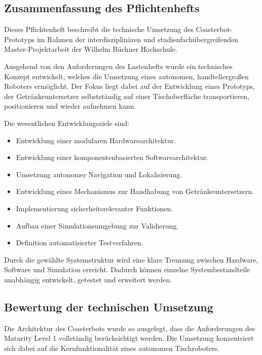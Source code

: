 \subsection{Zusammenfassung des
Pflichtenhefts}\label{zusammenfassung-des-pflichtenhefts}

Dieses Pflichtenheft beschreibt die technische Umsetzung des
Coasterbot-Prototyps im Rahmen der interdisziplinären und
studienfachübergreifenden Master-Projektarbeit der Wilhelm Büchner
Hochschule.

Ausgehend von den Anforderungen des Lastenhefts wurde ein technisches
Konzept entwickelt, welches die Umsetzung eines autonomen,
handtellergroßen Roboters ermöglicht. Der Fokus liegt dabei auf der
Entwicklung eines Prototyps, der Getränkeuntersetzer selbstständig auf
einer Tischoberfläche transportieren, positionieren und wieder aufnehmen
kann.

Die wesentlichen Entwicklungsziele sind:

\begin{itemize}
\tightlist
\item
  Entwicklung einer modularen Hardwarearchitektur.
\item
  Entwicklung einer komponentenbasierten Softwarearchitektur.
\item
  Umsetzung autonomer Navigation und Lokalisierung.
\item
  Entwicklung eines Mechanismus zur Handhabung von Getränkeuntersetzern.
\item
  Implementierung sicherheitsrelevanter Funktionen.
\item
  Aufbau einer Simulationsumgebung zur Validierung.
\item
  Definition automatisierter Testverfahren.
\end{itemize}

Durch die gewählte Systemstruktur wird eine klare Trennung zwischen
Hardware, Software und Simulation erreicht. Dadurch können einzelne
Systembestandteile unabhängig entwickelt, getestet und erweitert werden.

\subsection{Bewertung der technischen
Umsetzung}\label{bewertung-der-technischen-umsetzung}

Die Architektur des Coasterbots wurde so ausgelegt, dass die
Anforderungen des Maturity Level 1 vollständig berücksichtigt werden.
Die Umsetzung konzentriert sich dabei auf die Kernfunktionalität eines
autonomen Tischroboters.

